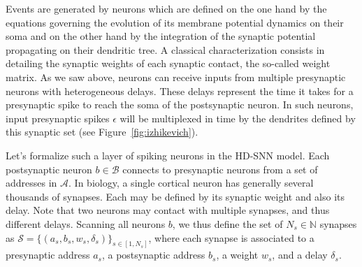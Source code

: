 \documentclass[runningheads]{llncs}
\newcommand{\presynaddr}{a} %
\newcommand{\postsynaddr}{b} %
\newcommand{\presynaddrspace}{\mathcal{A}} %
\newcommand{\postsynaddrspace}{\mathcal{B}} %
\newcommand{\synapse}{\mathcal{S}} %
\newcommand{\synapticweight}{w} %
\newcommand{\synapticdelay}{\delta} %
\newcommand{\ranksyn}{s} %
\newcommand{\Nsyn}{N_{s}} %
\newcommand{\event}{\epsilon} %
\begin{document}
Events are generated by neurons which are defined on the one hand by the equations governing the evolution of its membrane potential dynamics on their soma and on the other hand by the integration of the synaptic potential propagating on their dendritic tree. A classical characterization consists in detailing the synaptic weights of each synaptic contact, the so-called weight matrix. As we saw above, neurons can receive inputs from multiple presynaptic neurons with heterogeneous delays. These delays represent the time it takes for a presynaptic spike to reach the soma of the postsynaptic neuron. 
In such neurons, %
input presynaptic spikes $\event$ will be multiplexed in time by the dendrites defined by this synaptic set (see Figure~\ref{fig:izhikevich}). %

Let's formalize such a layer of spiking neurons in the HD-SNN model. Each postsynaptic neuron $\postsynaddr \in \postsynaddrspace$  connects to presynaptic neurons from a set of addresses in  $\presynaddrspace$. In biology, a single cortical neuron has generally several thousands of synapses. Each may be defined by its synaptic weight and also its delay. %
Note that two neurons may contact with multiple synapses, and thus different delays. Scanning all neurons $\postsynaddr$, we thus define the set of $\Nsyn \in \mathbb{N}$ synapses  as  $\synapse = \{(\presynaddr_\ranksyn, \postsynaddr_\ranksyn, \synapticweight_\ranksyn, \synapticdelay_\ranksyn)\}_{\ranksyn \in [1,\Nsyn]}$, where each synapse is associated to a presynaptic address $\presynaddr_\ranksyn$, a postsynaptic address $\postsynaddr_\ranksyn$,  a weight $\synapticweight_\ranksyn$, and a delay $\synapticdelay_\ranksyn$. 
\end{document}
